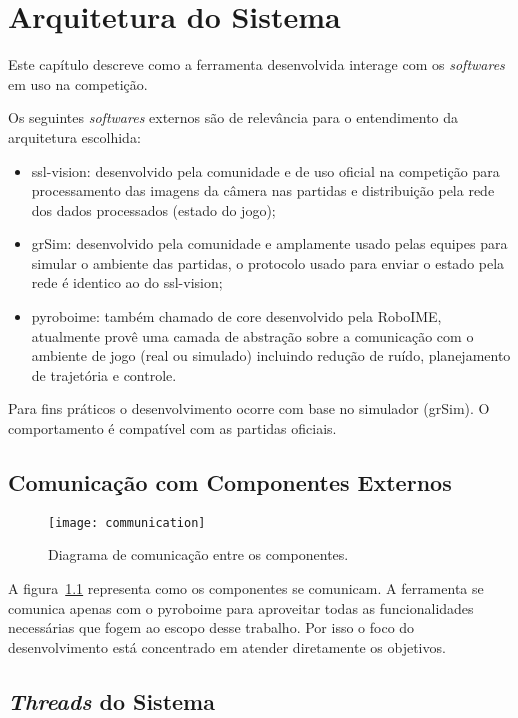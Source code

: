 \chapter{Arquitetura do Sistema}\label{cap:arch_sys}

Este capítulo descreve como a ferramenta desenvolvida interage com os
\textit{softwares} em uso na competição.

Os seguintes \textit{softwares} externos são de relevância para o entendimento
da arquitetura escolhida:

\begin{itemize}
  \item ssl-vision: desenvolvido pela comunidade e de uso oficial na competição
    para processamento das imagens da câmera nas partidas e distribuição pela
    rede dos dados processados (estado do jogo);
  \item grSim: desenvolvido pela comunidade e amplamente usado pelas equipes
    para simular o ambiente das partidas, o protocolo usado para enviar o estado
    pela rede é identico ao do ssl-vision;
  \item pyroboime: também chamado de core desenvolvido pela RoboIME, atualmente
    provê uma camada de abstração sobre a comunicação com o ambiente de jogo
    (real ou simulado) incluindo redução de ruído, planejamento de trajetória e
    controle.
\end{itemize}

Para fins práticos o desenvolvimento ocorre com base no simulador (grSim).
O comportamento é compatível com as partidas oficiais.

\section{Comunicação com Componentes Externos}

\begin{figure}[H]
  \centering
  \texttt{[image: communication]}
  \caption{Diagrama de comunicação entre os componentes.}\label{fig:arch-comm}
\end{figure}

A figura~\ref{fig:arch-comm} representa como os componentes se comunicam.  A
ferramenta se comunica apenas com o pyroboime para aproveitar todas as
funcionalidades necessárias que fogem ao escopo desse trabalho.  Por isso o foco
do desenvolvimento está concentrado em atender diretamente os objetivos.

\section{\textit{Threads} do Sistema}


